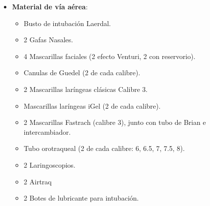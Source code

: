 \begin{itemize}[topsep=0pt, partopsep=0pt,itemsep=0pt,parsep=0pt]
\begin{itemize}[topsep=0pt, partopsep=0pt,itemsep=0pt,parsep=0pt]
\begin{multicols}{2}
\begin{itemize}[topsep=0pt, partopsep=0pt,itemsep=0pt,parsep=0pt]
                \item Hidrocortisona 100 mg (20 mg/mL).
                \item Hidroxicobalamina 100 mg (5000 $\mu$g/mL).
                \item Labetalol 100 mg (5 mg/mL).
                \item Lidocaína 2 \% 200 mg (20 mg/mL).
                \item Matamizol magnésico 2g (0.04 mg/mL).
                \item Midozalam 15 mg (5mg/mL).
                \item Morfina 10 mg/mL
                \item Nitroglicerina 50 mg (5 mg/mL).
                \item Noradrenalina 10 mg (2 mg/mL).
                \item Propofol 200 mg (10 mg/mL).
                \item Rocuronio 50 mg (10 mg/mL)
                \item Sulfato magnésico 1,5 mg (150 mg/mL).
                \item Urapidilo 50 mg (5 mg/mL).
            \end{itemize}
        \end{multicols}
    \end{itemize}
    \item \textbf{Material de vía aérea}:
    \begin{itemize}[topsep=0pt, partopsep=0pt,itemsep=0pt,parsep=0pt]
        \item Busto de intubación Laerdal.
        \item 2 Gafas Nasales.
        \item 4 Mascarillas faciales (2 efecto Venturi, 2 con reservorio).
        \item Canulas de Guedel (2 de cada calibre).
        \item 2 Mascarillas laríngeas clásicas Calibre 3.
        \item Mascarillas laríngeas iGel (2 de cada calibre).
        \item 2 Mascarillas Fastrach (calibre 3), junto con tubo de Brian e intercambiador.
        \item Tubo orotraqueal (2 de cada calibre: 6, 6.5, 7, 7.5, 8).
        \item 2 Laringoscopios.
        \item 2 Airtraq
        \item 2 Botes de lubricante para intubación.

\end{itemize}
\end{itemize}
